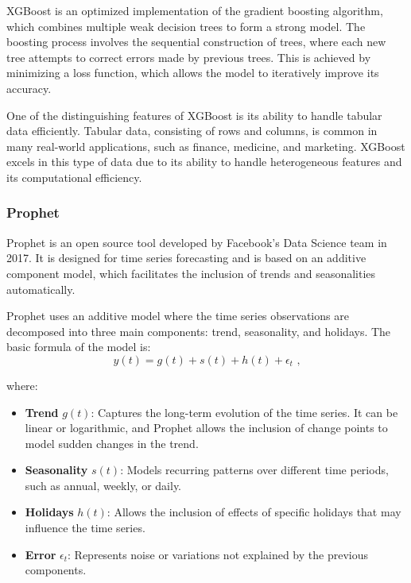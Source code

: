 XGBoost is an optimized implementation of the gradient boosting algorithm, which combines multiple weak decision trees to form a strong model. The boosting process involves the sequential construction of trees, where each new tree attempts to correct errors made by previous trees. This is achieved by minimizing a loss function, which allows the model to iteratively improve its accuracy.

One of the distinguishing features of XGBoost is its ability to handle tabular data efficiently. Tabular data, consisting of rows and columns, is common in many real-world applications, such as finance, medicine, and marketing. XGBoost excels in this type of data due to its ability to handle heterogeneous features and its computational efficiency.
\vspace{10pt}

\subsubsection{Prophet}
Prophet\cite{prophet} is an open source tool developed by Facebook's Data Science team in 2017. It is designed for time series forecasting and is based on an additive component model, which facilitates the inclusion of trends and seasonalities automatically.

Prophet uses an additive model where the time series observations are decomposed into three main components: trend, seasonality, and holidays. The basic formula of the model is:
\begin{equation}
y(t) = g(t) + s(t) + h(t) + \epsilon_t \text{ ,}
\end{equation}

where:
\begin{itemize}
    \item \textbf{Trend} \(g(t)\): Captures the long-term evolution of the time series. It can be linear or logarithmic, and Prophet allows the inclusion of change points to model sudden changes in the trend.
    \item \textbf{Seasonality} \(s(t)\): Models recurring patterns over different time periods, such as annual, weekly, or daily.
    \item \textbf{Holidays} \(h(t)\): Allows the inclusion of effects of specific holidays that may influence the time series.
    \item \textbf{Error} \(\epsilon_t\): Represents noise or variations not explained by the previous components.
\end{itemize}

